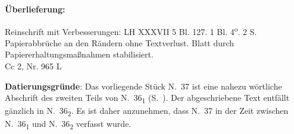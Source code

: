 \begin{ledgroupsized}[r]{120mm}
\footnotesize 
\pstart 
\noindent\textbf{\"{U}berlieferung:}
\pend
\end{ledgroupsized}

\begin{ledgroupsized}[r]{114mm}
\footnotesize 
\pstart \parindent -6mm
Reinschrift mit Verbesserungen:
LH XXXVII 5 Bl. 127.
1 Bl. 4\textsuperscript{o}. 2 S.
Papierabbr\"{u}che an den R\"{a}ndern ohne Textverlust.
Blatt durch Papiererhaltungsma{\ss}nahmen stabilisiert.%
\\Cc 2, Nr. 965 L
\pend
\end{ledgroupsized}
\vspace*{5mm}
\begin{ledgroup}
\footnotesize 
\pstart
\noindent\footnotesize{\textbf{Datierungsgr\"{u}nde}: Das vorliegende St\"{u}ck N.~37 ist eine nahezu w\"{o}rtliche Abschrift des zweiten Teils von N.~36\textsubscript{1} (S.~).
Der abgeschriebene Text entf\"{a}llt g\"{a}nzlich in N.~36\textsubscript{2}.
Es ist daher anzunehmen, dass N.~37 in der Zeit zwischen N.~36\textsubscript{1} und N.~36\textsubscript{2} verfasst wurde.}%
\pend
\end{ledgroup}

